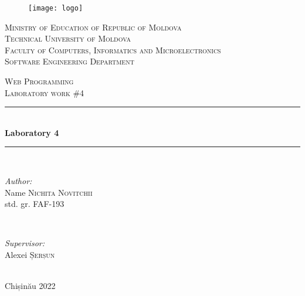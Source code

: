 \begin{titlepage}
  \begin{center}
  \begin{figure}[!h]
    \centering
    \texttt{[image: logo]}
  \end{figure}

  \textsc{\large Ministry of Education of Republic of Moldova}\\[0.5cm]
  \textsc{\large Technical University of Moldova}\\[0.5cm]
  \textsc{\large Faculty of Computers, Informatics and Microelectronics}\\[0.5cm]
  \textsc{\large Software Engineering Department}\\[1.2cm]

  \vspace{25 mm}

  \textsc{\Large Web Programming}\\[0.5cm]
  \textsc{\large Laboratory work \#4}\\[0.5cm]   

  \newcommand{\HRule}{\rule{\linewidth}{0.5mm}}
  \vspace{10 mm}
  \HRule \\[0.4cm]
  { \LARGE \bfseries Laboratory 4  }\\[0.4cm] 
  \HRule \\[1.5cm]

  \vspace{10mm}

  \begin{minipage}[t]{0.4\textwidth}
  \begin{flushleft} \large
  \emph{Author:} \\
  Name \textsc{Nichita Novitchii}\\                         
  std. gr. FAF-193                               
  \end{flushleft}
  \end{minipage}
  ~
  \begin{minipage}[t]{0.4\textwidth}
  \begin{flushright} \large
  \emph{Supervisor:} \\
  Alexei \textsc{Șerșun}\\
  \end{flushright}
  \end{minipage}\\[3cm]

  \vspace{5 mm}
  \large Chișinău 2022\\[0.5cm]

  \vfill
  \end{center}

\end{titlepage}
